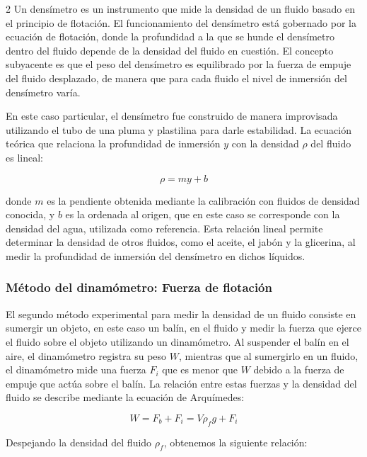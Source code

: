 \documentclass[10pt,letterpaper]{article}
\begin{document}
\begin{multicols}{2}
Un densímetro es un instrumento que mide la densidad de un fluido basado en el principio de flotación. El funcionamiento del densímetro está gobernado por la ecuación de flotación, donde la profundidad a la que se hunde el densímetro dentro del fluido depende de la densidad del fluido en cuestión. El concepto subyacente es que el peso del densímetro es equilibrado por la fuerza de empuje del fluido desplazado, de manera que para cada fluido el nivel de inmersión del densímetro varía.

En este caso particular, el densímetro fue construido de manera improvisada utilizando el tubo de una pluma y plastilina para darle estabilidad. La ecuación teórica que relaciona la profundidad de inmersión \( y \) con la densidad \( \rho \) del fluido es lineal:

\begin{equation}
\rho = my + b
\end{equation}

donde \( m \) es la pendiente obtenida mediante la calibración con fluidos de densidad conocida, y \( b \) es la ordenada al origen, que en este caso se corresponde con la densidad del agua, utilizada como referencia. Esta relación lineal permite determinar la densidad de otros fluidos, como el aceite, el jabón y la glicerina, al medir la profundidad de inmersión del densímetro en dichos líquidos.

\subsubsection*{Método del dinamómetro: Fuerza de flotación}

El segundo método experimental para medir la densidad de un fluido consiste en sumergir un objeto, en este caso un balín, en el fluido y medir la fuerza que ejerce el fluido sobre el objeto utilizando un dinamómetro. Al suspender el balín en el aire, el dinamómetro registra su peso \( W \), mientras que al sumergirlo en un fluido, el dinamómetro mide una fuerza \( F_i \) que es menor que \( W \) debido a la fuerza de empuje que actúa sobre el balín. La relación entre estas fuerzas y la densidad del fluido se describe mediante la ecuación de Arquímedes:

\begin{equation}
W = F_b + F_i = V \rho_f g + F_i
\end{equation}

Despejando la densidad del fluido \( \rho_f \), obtenemos la siguiente relación:


\end{multicols}
\end{document}
